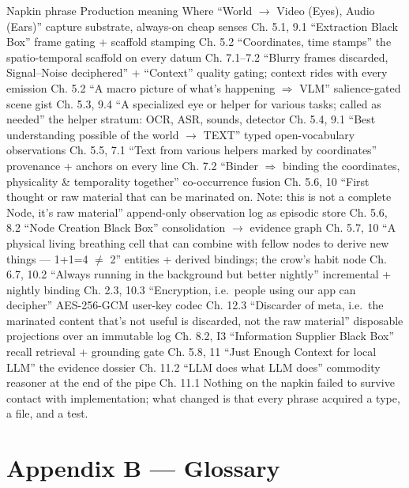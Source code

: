 Napkin phrase Production meaning Where ``World \(\rightarrow\) Video (Eyes), Audio (Ears)'' capture substrate, always-on cheap senses Ch. 5.1, 9.1 ``Extraction Black Box'' frame gating + scaffold stamping Ch. 5.2 ``Coordinates, time stamps'' the spatio-temporal scaffold on every datum Ch. 7.1--7.2 ``Blurry frames discarded, Signal--Noise deciphered'' + ``Context'' quality gating; context rides with every emission Ch. 5.2 ``A macro picture of what's happening \(\Rightarrow\) VLM'' salience-gated scene gist Ch. 5.3, 9.4 ``A specialized eye or helper for various tasks; called as needed'' the helper stratum: OCR, ASR, sounds, detector Ch. 5.4, 9.1 ``Best understanding possible of the world \(\rightarrow\) TEXT'' typed open-vocabulary observations Ch. 5.5, 7.1 ``Text from various helpers marked by coordinates'' provenance + anchors on every line Ch. 7.2 ``Binder \(\Rightarrow\) binding the coordinates, physicality \& temporality together'' co-occurrence fusion Ch. 5.6, 10 ``First thought or raw material that can be marinated on. Note: this is not a complete Node, it's raw material'' append-only observation log as episodic store Ch. 5.6, 8.2 ``Node Creation Black Box'' consolidation \(\rightarrow\) evidence graph Ch. 5.7, 10 ``A physical living breathing cell that can combine with fellow nodes to derive new things --- 1+1=4 \(\neq\) 2'' entities + derived bindings; the crow's habit node Ch. 6.7, 10.2 ``Always running in the background but better nightly'' incremental + nightly binding Ch. 2.3, 10.3 ``Encryption, i.e.~people using our app can decipher'' AES-256-GCM user-key codec Ch. 12.3 ``Discarder of meta, i.e.~the marinated content that's not useful is discarded, not the raw material'' disposable projections over an immutable log Ch. 8.2, I3 ``Information Supplier Black Box'' recall retrieval + grounding gate Ch. 5.8, 11 ``Just Enough Context for local LLM'' the evidence dossier Ch. 11.2 ``LLM does what LLM does'' commodity reasoner at the end of the pipe Ch. 11.1 Nothing on the napkin failed to survive contact with implementation; what changed is that every phrase acquired a type, a file, and a test.

\chapter*{Appendix B --- Glossary}\label{appendix-b-glossary}

